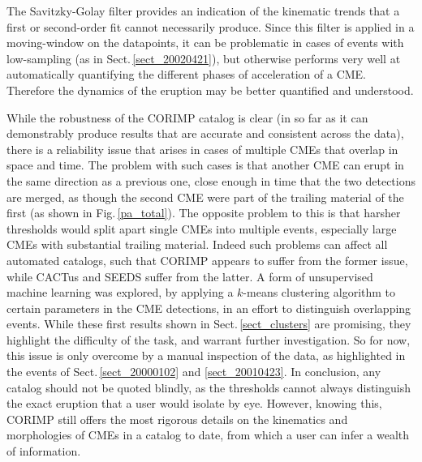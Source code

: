 \documentclass[referee,a4paper,12pt,traditabstract]{swsc}
\begin{document}
\begin{linenumbers}
The Savitzky-Golay filter provides an indication of the kinematic trends that a first or second-order fit cannot necessarily produce. Since this filter is applied in a moving-window on the datapoints, it can be problematic in cases of events with low-sampling (as in Sect.\,\ref{sect_20020421}), but otherwise performs very well at automatically quantifying the different phases of acceleration of a CME. Therefore the dynamics of the eruption may be better quantified and understood.  

While the robustness of the CORIMP catalog is clear (in so far as it can demonstrably produce results that are accurate and consistent across the data), there is a reliability issue that arises in cases of multiple CMEs that overlap in space and time. The problem with such cases is that another CME can erupt in the same direction as a previous one, close enough in time that the two detections are merged, as though the second CME were part of the trailing material of the first (as shown in Fig.\,\ref{pa_total}). The opposite problem to this is that harsher thresholds would split apart single CMEs into multiple events, especially large CMEs with substantial trailing material. Indeed such problems can affect all automated catalogs, such that CORIMP appears to suffer from the former issue, while CACTus and SEEDS suffer from the latter. A form of unsupervised machine learning was explored, by applying a $k$-means clustering algorithm to certain parameters in the CME detections, in an effort to distinguish overlapping events. While these first results shown in Sect.\,\ref{sect_clusters} are promising, they highlight the difficulty of the task, and warrant further investigation. So for now, this issue is only overcome by a manual inspection of the data, as highlighted in the events of Sect.\,\ref{sect_20000102} and \ref{sect_20010423}. In conclusion, any catalog should not be quoted blindly, as the thresholds cannot always distinguish the exact eruption that a user would isolate by eye. However, knowing this, CORIMP still offers the most rigorous details on the kinematics and morphologies of CMEs in a catalog to date, from which a user can infer a wealth of information.




\end{linenumbers}
\end{document}
